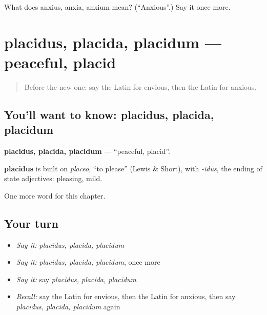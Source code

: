 \begin{tcolorbox}[breakable,colback=teal!4,colframe=teal!35!black,title={Before you move on}]
What does anxius, anxia, anxium mean? (\textquotedblleft{}Anxious\textquotedblright{}.) Say it once more.
\end{tcolorbox}
\section[placidus, placida, placidum]{placidus, placida, placidum — peaceful, placid}

\label{lesson:LA-C212-placidus}



\begin{quote}
Before the new one: say the Latin for envious, then the Latin for anxious.
\end{quote}

\subsection*{You'll want to know: placidus, placida, placidum}
\textbf{placidus, placida, placidum} — \textquotedblleft{}peaceful, placid\textquotedblright{}.

\begin{cousinweb}
\textbf{placidus} is built on \emph{placeō}, \textquotedblleft{}to please\textquotedblright{} (Lewis \& Short), with \emph{-idus}, the ending of state adjectives: pleasing, mild.
\end{cousinweb}

\begin{grammarlens}[title={What you've built}]
One more word for this chapter.
\end{grammarlens}

\subsection*{Your turn}
\begin{itemize}
\raggedright
  \item \emph{Say it:} \emph{placidus, placida, placidum}
  \item \emph{Say it:} \emph{placidus, placida, placidum}, once more
  \item \emph{Say it:} say \emph{placidus, placida, placidum}
  \item \emph{Recall:} say the Latin for envious, then the Latin for anxious, then say \emph{placidus, placida, placidum} again
\end{itemize}

